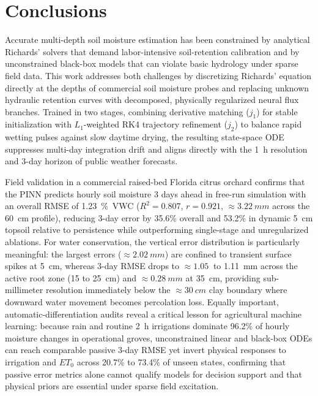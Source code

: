 \documentclass[pdflatex,sn-nature]{sn-jnl}%
\theoremstyle{thmstyleone}%
\theoremstyle{thmstyletwo}%
\theoremstyle{thmstylethree}%
\begin{document}
{\color{blue}\section*{Conclusions}
Accurate multi-depth soil moisture estimation has been constrained by analytical Richards' solvers that demand labor-intensive soil-retention calibration and by unconstrained black-box models that can violate basic hydrology under sparse field data. This work addresses both challenges by discretizing Richards' equation directly at the depths of commercial soil moisture probes and replacing unknown hydraulic retention curves with decomposed, physically regularized neural flux branches. Trained in two stages, combining derivative matching ($j_1$) for stable initialization with $L_1$-weighted RK4 trajectory refinement ($j_2$) to balance rapid wetting pulses against slow daytime drying, the resulting state-space ODE suppresses multi-day integration drift and aligns directly with the \SI{1}{h} resolution and 3-day horizon of public weather forecasts.

Field validation in a commercial raised-bed Florida citrus orchard confirms that the PINN predicts hourly soil moisture 3 days ahead in free-run simulation with an overall RMSE of \SI{1.23}{\%VWC} ($R^2 = 0.807$, $r = 0.921$, $\approx\SI{3.22}{mm}$ across the \SI{60}{cm} profile), reducing 3-day error by 35.6\% overall and 53.2\% in dynamic \SI{5}{cm} topsoil relative to persistence while outperforming single-stage and unregularized ablations. For water conservation, the vertical error distribution is particularly meaningful: the largest errors ($\approx\SI{2.02}{mm}$) are confined to transient surface spikes at \SI{5}{cm}, whereas 3-day RMSE drops to $\approx\SI{1.05}{}$ to \SI{1.11}{mm} across the active root zone (15 to 25~\si{cm}) and $\approx\SI{0.28}{mm}$ at 35~\si{cm}, providing sub-millimeter resolution immediately below the $\approx\SI{30}{cm}$ clay boundary where downward water movement becomes percolation loss. Equally important, automatic-differentiation audits reveal a critical lesson for agricultural machine learning: because rain and routine 2~\si{h} irrigations dominate 96.2\% of hourly moisture changes in operational groves, unconstrained linear and black-box ODEs can reach comparable passive 3-day RMSE yet invert physical responses to irrigation and $ET_0$ across 20.7\% to 73.4\% of unseen states, confirming that passive error metrics alone cannot qualify models for decision support and that physical priors are essential under sparse field excitation.

}
\end{document}
